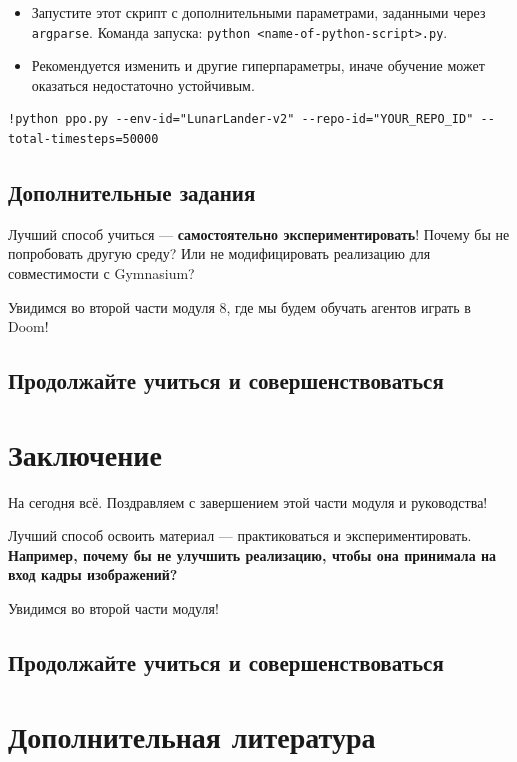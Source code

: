 \documentclass[11pt,a4paper]{article}
\begin{document}
\begin{itemize}
\item
  Запустите этот скрипт с дополнительными параметрами, заданными через \texttt{argparse}. Команда запуска: \texttt{python\ \textless{}name-of-python-script\textgreater{}.py}.
\item
  Рекомендуется изменить и другие гиперпараметры, иначе обучение может оказаться недостаточно устойчивым.
\end{itemize}

\begin{lstlisting}
!python ppo.py --env-id="LunarLander-v2" --repo-id="YOUR_REPO_ID" --total-timesteps=50000
\end{lstlisting}

\subsection{Дополнительные задания}\label{some-additional-challenges}

Лучший способ учиться --- \textbf{самостоятельно экспериментировать}! Почему бы не попробовать другую среду? Или не модифицировать реализацию для совместимости с Gymnasium?

Увидимся во второй части модуля 8, где мы будем обучать агентов играть в Doom!

\subsection{Продолжайте учиться и совершенствоваться}\label{keep-learning-stay-awesome}

\section{Заключение}\label{conclusion}

На сегодня всё. Поздравляем с завершением этой части модуля и руководства!

Лучший способ освоить материал --- практиковаться и экспериментировать. \textbf{Например, почему бы не улучшить реализацию, чтобы она принимала на вход кадры изображений?}

Увидимся во второй части модуля!

\subsection{Продолжайте учиться и совершенствоваться}\label{keep-learning-stay-awesome-1}

\section{Дополнительная литература}\label{additional-readings}
\end{document}
